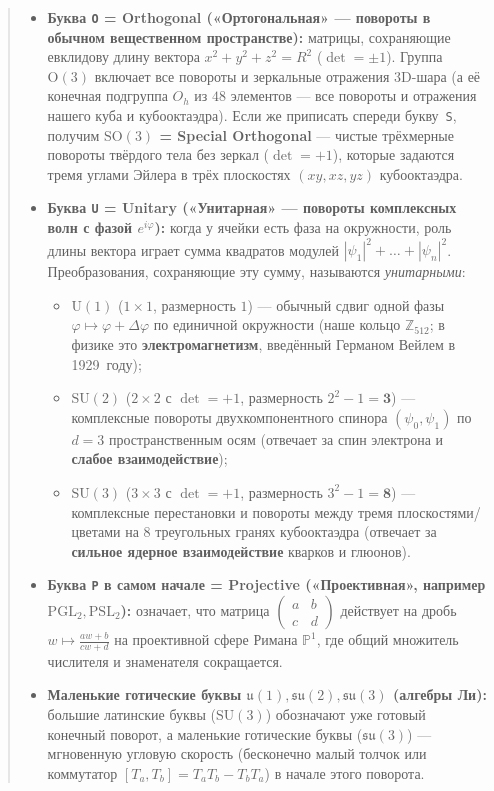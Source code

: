 \begin{quote}
\begin{itemize}[noitemsep,leftmargin=*]
\item \textbf{Буква \texttt{O} = Orthogonal («Ортогональная» --- повороты в обычном вещественном пространстве):} матрицы, сохраняющие евклидову длину вектора $x^2 + y^2 + z^2 = R^2$ ($\det = \pm 1$). Группа \textbf{$\mathrm{O}(3)$} включает все повороты и зеркальные отражения 3D-шара (а её конечная подгруппа \textbf{$O_h$} из $48$ элементов --- все повороты и отражения нашего куба и кубооктаэдра). Если же приписать спереди букву~\texttt{S}, получим \textbf{$\mathrm{SO}(3)$ = Special Orthogonal} --- чистые трёхмерные повороты твёрдого тела без зеркал ($\det = +1$), которые задаются тремя углами Эйлера в трёх плоскостях $(xy, xz, yz)$ кубооктаэдра.
\item \textbf{Буква \texttt{U} = Unitary («Унитарная» --- повороты комплексных волн с фазой $e^{i\varphi}$):} когда у ячейки есть фаза на окружности, роль длины вектора играет сумма квадратов модулей $|\psi_1|^2 + \dots + |\psi_n|^2$. Преобразования, сохраняющие эту сумму, называются \emph{унитарными}:
  \begin{itemize}[noitemsep]
  \item \textbf{$\mathrm{U}(1)$} ($1\times 1$, размерность $1$) --- обычный сдвиг одной фазы $\varphi \mapsto \varphi + \Delta\varphi$ по единичной окружности (наше кольцо $\mathbb{Z}_{512}$; в физике это \textbf{электромагнетизм}, введённый Германом Вейлем в 1929~году);
  \item \textbf{$\mathrm{SU}(2)$} ($2\times 2$ с $\det = +1$, размерность $2^2 - 1 = \mathbf{3}$) --- комплексные повороты двухкомпонентного спинора $(\psi_0, \psi_1)$ по $d = 3$ пространственным осям (отвечает за спин электрона и \textbf{слабое взаимодействие});
  \item \textbf{$\mathrm{SU}(3)$} ($3\times 3$ с $\det = +1$, размерность $3^2 - 1 = \mathbf{8}$) --- комплексные перестановки и повороты между тремя плоскостями/цветами на $8$ треугольных гранях кубооктаэдра (отвечает за \textbf{сильное ядерное взаимодействие} кварков и глюонов).
  \end{itemize}
\item \textbf{Буква \texttt{P} в самом начале = Projective («Проективная», например $\mathrm{PGL}_2, \mathrm{PSL}_2$):} означает, что матрица $\begin{pmatrix} a & b \\ c & d \end{pmatrix}$ действует на дробь $w \mapsto \frac{aw+b}{cw+d}$ на проективной сфере Римана $\mathbb{P}^1$, где общий множитель числителя и знаменателя сокращается.
\item \textbf{Маленькие готические буквы $\mathfrak{u}(1), \mathfrak{su}(2), \mathfrak{su}(3)$ (алгебры Ли):} большие латинские буквы ($\mathrm{SU}(3)$) обозначают уже готовый конечный поворот, а маленькие готические буквы ($\mathfrak{su}(3)$) --- мгновенную угловую скорость (бесконечно малый толчок или коммутатор $[T_a, T_b] = T_a T_b - T_b T_a$) в начале этого поворота.
\end{itemize}
\end{quote}

